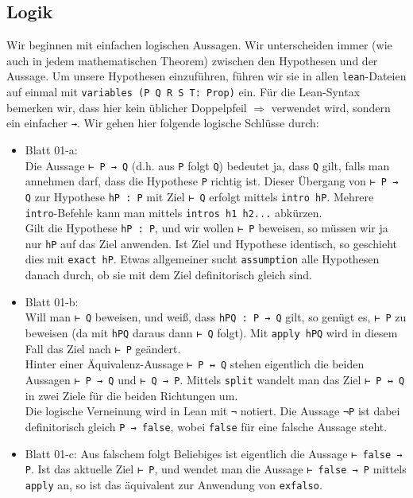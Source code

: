 \documentclass[11pt]{article}
\newcommand{\leanin}{\texttt}
\newcommand{\leanstate}{\texttt}
\begin{document}
\subsection{Logik}
Wir beginnen mit einfachen logischen Aussagen. Wir unterscheiden immer (wie auch in jedem mathematischen Theorem) zwischen den Hypothesen und der Aussage. Um unsere Hypothesen einzuführen, führen wir sie in allen \leanstate{lean}-Dateien auf einmal mit \leanin{variables (P Q R S T: Prop)} ein. Für die Lean-Syntax bemerken wir, dass hier kein üblicher Doppelpfeil $\Longrightarrow$ verwendet wird, sondern ein einfacher \leanstate{→}. Wir gehen hier folgende logische Schlüsse durch:
\begin{itemize}
\item Blatt 01-a: \\
  Die Aussage \leanstate{⊢ P → Q} (d.h. aus \leanstate{P} folgt \leanstate{Q}) bedeutet ja, dass \leanstate{Q} gilt, falls man annehmen darf, dass die Hypothese \leanstate{P} richtig ist. Dieser Übergang von \leanstate{⊢ P → Q} zur Hypothese \leanstate{hP : P} mit Ziel \leanstate{⊢ Q} erfolgt mittels \leanin{intro hP}. Mehrere \leanstate{intro}-Befehle kann man mittels \leanstate{intros h1 h2...} abkürzen.
  \\
  Gilt die Hypothese \leanstate{hP : P}, und wir wollen \leanstate{⊢ P} beweisen, so müssen wir ja nur \leanstate{hP} auf das Ziel anwenden. Ist Ziel und Hypothese identisch, so geschieht dies mit \leanin{exact hP}. Etwas allgemeiner sucht \leanin{assumption} alle Hypothesen danach durch, ob sie mit dem Ziel definitorisch gleich sind. 
\item Blatt 01-b: \\
  Will man \leanstate{⊢ Q} beweisen, und weiß, dass \leanstate{hPQ : P → Q} gilt, so genügt es, \leanstate{⊢ P} zu beweisen (da mit \leanstate{hPQ} daraus dann \leanstate{⊢ Q} folgt). Mit \leanin{apply hPQ} wird in diesem Fall das Ziel nach \leanstate{⊢ P} geändert. \\
  Hinter einer Äquivalenz-Aussage \leanstate{⊢ P ↔ Q} stehen eigentlich die beiden Aussagen \leanstate{⊢ P → Q} und  \leanstate{⊢ Q → P}. Mittels \leanin{split} wandelt man das Ziel \leanstate{⊢ P ↔ Q} in zwei Ziele für die beiden Richtungen um. \\
  Die logische Verneinung wird in Lean mit \leanstate{¬} notiert. Die Aussage \leanstate{¬P} ist dabei definitorisch gleich \leanstate{P → false}, wobei \leanstate{false} für eine falsche Aussage steht.   
\item Blatt 01-c: Aus falschem folgt Beliebiges ist eigentlich die Aussage \leanstate{⊢ false → P}. Ist das aktuelle Ziel \leanstate{⊢ P}, und wendet man die Aussage \leanstate{⊢ false → P} mittels \leanin{apply} an, so ist das äquivalent zur Anwendung von \leanin{exfalso}. \\

\end{itemize}
\end{document}
